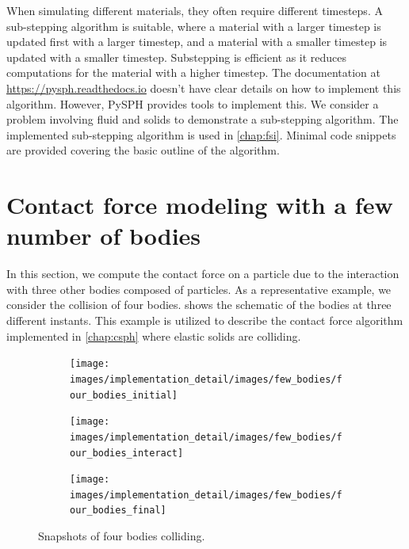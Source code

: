When simulating different materials, they often require different timesteps. A
sub-stepping algorithm is suitable, where a material with a larger timestep is
updated first with a larger timestep, and a material with a smaller timestep is
updated with a smaller timestep. Substepping is efficient as it reduces
computations for the material with a higher timestep. The documentation at
\url{https://pysph.readthedocs.io} doesn't have clear details on how to
implement this algorithm. However, PySPH provides tools to implement this. We
consider a problem involving fluid and solids to demonstrate a sub-stepping
algorithm. The implemented sub-stepping algorithm is used in \cref{chap:fsi}.
Minimal code snippets are provided covering the basic outline of the algorithm.


\FloatBarrier%
\section{Contact force modeling with a few number of bodies}
\label{sec:tracking-few-bodies}
In this section, we compute the contact force on a particle due to the
interaction with three other bodies composed of particles. As a representative
example, we consider the collision of four bodies. 
shows the schematic of the bodies at three different instants. This example is
utilized to describe the contact force algorithm implemented in \cref{chap:csph}
where elastic solids are colliding.
\begin{figure}[!htpb]
  \centering
  \begin{subfigure}{0.32\textwidth}
    \centering
    \texttt{[image: images/implementation\_detail/images/few\_bodies/four\_bodies\_initial]}
  \end{subfigure}
  \begin{subfigure}{0.32\textwidth}
    \centering
    \texttt{[image: images/implementation\_detail/images/few\_bodies/four\_bodies\_interact]}
  \end{subfigure}
  \begin{subfigure}{0.32\textwidth}
    \centering
    \texttt{[image: images/implementation\_detail/images/few\_bodies/four\_bodies\_final]}
  \end{subfigure}
  \caption{Snapshots of four bodies colliding.}
\label{fig:id:four_bodies_contact}
\end{figure}


